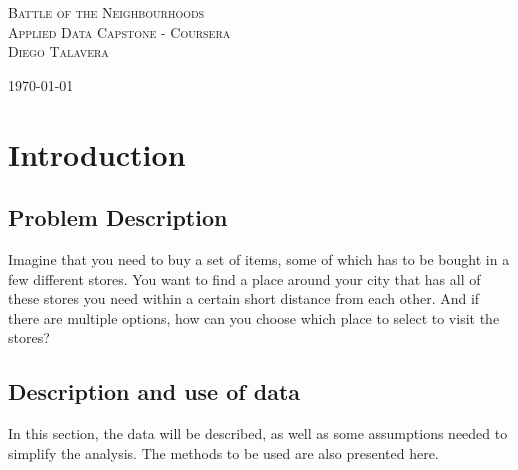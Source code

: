\documentclass{article}
\begin{document}
	
	\begin{titlepage}
		\center
		\newcommand{\HRule}{\rule{\linewidth}{0.5mm}}
			\textsc{\Huge Battle of the Neighbourhoods}\\[1.5cm]
			\textsc{\LARGE Applied Data Capstone - Coursera}\\[0.3cm]
			\textsc{\large Diego Talavera}\\[0.5cm]
		
			\vfill\vfill\vfill %
			
			{\large\today} %
	\end{titlepage}
	
	
	\newpage				%
	\renewcommand{\contentsname}{Table of Contents}
	\tableofcontents		%
	
	
	\newpage
	\section{Introduction}
	\subsection{Problem Description}
		Imagine that you need to buy a set of items, some of which has to be bought in a few different stores. You want to find a place around your city that has all of these stores you need within a certain short distance from each other. And if there are multiple options, how can you choose which place to select to visit the stores?
	
	\subsection{Description and use of data}
		In this section, the data will be described, as well as some assumptions needed to simplify the analysis. The methods to be used are also presented here. 
		
\end{document}
